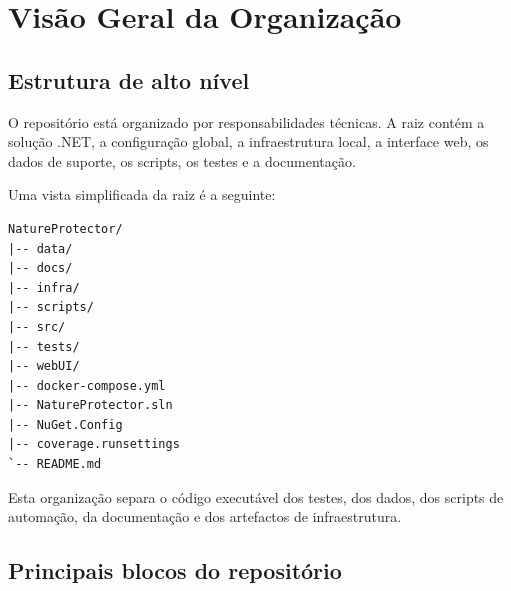 \section{Visão Geral da Organização}

\subsection{Estrutura de alto nível}

O repositório está organizado por responsabilidades técnicas. A raiz contém a solução .NET, a configuração global, a infraestrutura local, a interface web, os dados de suporte, os scripts, os testes e a documentação.

Uma vista simplificada da raiz é a seguinte:

\begin{verbatim}
NatureProtector/
|-- data/
|-- docs/
|-- infra/
|-- scripts/
|-- src/
|-- tests/
|-- webUI/
|-- docker-compose.yml
|-- NatureProtector.sln
|-- NuGet.Config
|-- coverage.runsettings
`-- README.md
\end{verbatim}

Esta organização separa o código executável dos testes, dos dados, dos scripts de automação, da documentação e dos artefactos de infraestrutura.

\subsection{Principais blocos do repositório}

